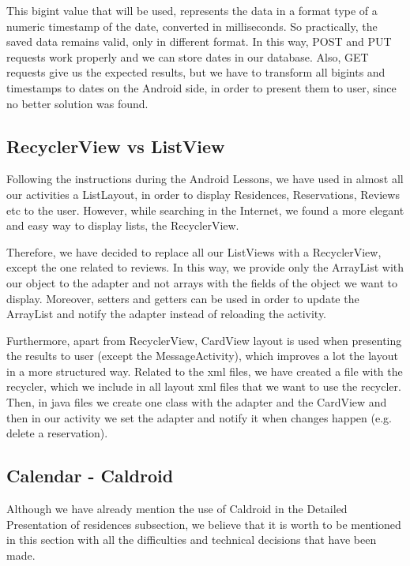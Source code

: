 \documentclass[12pt]{article}
\begin{document}
	This bigint value that will be used, represents the data in a format type of a numeric timestamp of the date, converted in milliseconds. So practically, the saved data remains valid, only in different format. In this way, POST and PUT requests work properly and we can store dates in our database. Also, GET requests give us the expected results, but we have to transform all bigints and timestamps to dates on the Android side, in order to present them to user, since no better solution was found.
	
	\subsection{RecyclerView vs ListView}
	
	Following the instructions during the Android Lessons, we have used in almost all our activities a ListLayout, in order to display Residences, Reservations, Reviews etc to the user. However, while searching in the Internet, we found a more elegant and easy way to display lists, the RecyclerView.
	
	Therefore, we have decided to replace all our ListViews with a RecyclerView, except the one related to reviews. In this way, we provide only the ArrayList with our object to the adapter and not arrays with the fields of the object we want to display. Moreover, setters and getters can be used in order to update the ArrayList and notify the adapter instead of reloading the activity.
	
	Furthermore, apart from RecyclerView, CardView layout is used when presenting the results to user (except the MessageActivity), which improves a lot the layout in a more structured way. Related to the xml files, we have created a file with the recycler, which we include in all layout xml files that we want to use the recycler. Then, in java files we create one class with the adapter and the CardView and then in our activity we set the adapter and notify it when changes happen (e.g. delete a reservation).
	
	\subsection{Calendar - Caldroid}
	
	Although we have already mention the use of Caldroid in the Detailed Presentation of residences subsection, we believe that it is worth to be mentioned in this section with all the difficulties and technical decisions that have been made.
	
\end{document}
